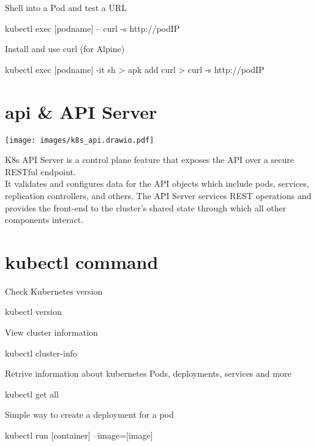 \documentclass{refcard}
\begin{document}
Shell into a Pod and test a URL
\begin{ttyenv}
kubectl exec [podname] -- curl -s http://podIP
\end{ttyenv}

Install and use curl (for Alpine)
\begin{ttyenv}
kubectl exec [podname] -it sh
> apk add curl
> curl -s http://podIP
\end{ttyenv}

\section{api \& API Server}

\begin{center}
    \texttt{[image: images/k8s\_api.drawio.pdf]}
\end{center}

K8s API Server is a control plane feature that exposes the API over a secure RESTful endpoint.\\

It validates and configures data for the API objects which include pods, services, replication controllers, and others. The API Server services REST operations and provides the front-end to the cluster's shared state through which all other components interact.\\

\section{kubectl command}

Check Kubernetes version
\begin{ttyenv}
kubectl version
\end{ttyenv}

View cluster information
\begin{ttyenv}
kubectl cluster-info
\end{ttyenv}

Retrive information about kubernetes Pods, deployments, services and more
\begin{ttyenv}
kubectl get all
\end{ttyenv}

Simple way to create a deployment for a pod
\begin{ttyenv}
kubectl run [container] --image=[image]
\end{ttyenv}
\end{document}
